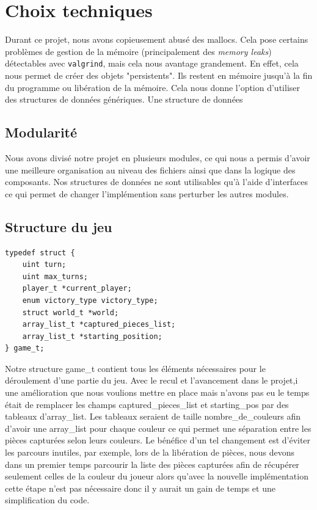 \section{Choix techniques}
Durant ce projet, nous avons copieusement abusé des mallocs. Cela pose
certains problèmes de gestion de la mémoire (principalement des \emph{memory leaks})
détectables avec \verb|valgrind|, mais cela nous avantage grandement.
En effet, cela nous permet de créer des
objets "persistents". Ils restent en mémoire jusqu'à la fin du programme
ou libération de la mémoire. Cela nous donne l'option d'utiliser des
structures de données génériques. Une structure de données

\subsection{Modularité}
Nous avons divisé notre projet en plusieurs modules, ce qui nous a permis d'avoir une meilleure organisation au niveau des fichiers
ainsi que dans la logique des composants. Nos structures de données ne sont utilisables qu'à l'aide d'interfaces ce qui permet de changer
l'implémention sans perturber les autres modules. 


\subsection{Structure du jeu}

\begin{verbatim}
typedef struct {
    uint turn;
    uint max_turns;
    player_t *current_player;
    enum victory_type victory_type;
    struct world_t *world;
    array_list_t *captured_pieces_list;
    array_list_t *starting_position;
} game_t;
\end{verbatim}


Notre structure game\_t contient tous les éléments nécessaires pour le déroulement d'une partie du jeu.
Avec le recul et l'avancement dans le projet,i une amélioration que nous voulions mettre en place mais n'avons
pas eu le temps était de remplacer les champs captured\_pieces\_list et starting\_pos par des tableaux d'array\_list.
Les tableaux seraient de taille nombre\_de\_couleurs afin d'avoir une array\_list pour chaque couleur ce qui permet
une séparation entre les pièces capturées selon leurs couleurs. Le bénéfice d'un tel changement est 
d'éviter les parcours inutiles, par exemple, lors de la libération de pièces, nous devons dans un premier temps
parcourir la liste des pièces capturées afin de récupérer seulement celles de la couleur du joueur alors
qu'avec la nouvelle implémentation cette étape n'est pas nécessaire donc il y aurait un gain de temps et
une simplification du code.  


